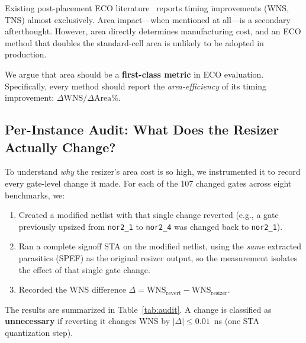 \documentclass[journal]{IEEEtran}
\begin{document}
Existing post-placement ECO literature~\cite{jiang2024ir, graphsym2023,
goalEvolve2026, elayout2026} reports timing improvements (WNS, TNS)
almost exclusively. Area impact---when mentioned at all---is a secondary
afterthought. However, area directly determines manufacturing cost, and
an ECO method that doubles the standard-cell area is unlikely to be
adopted in production.

We argue that area should be a \textbf{first-class metric} in ECO
evaluation. Specifically, every method should report the
\emph{area-efficiency} of its timing improvement:
$\Delta\text{WNS} / \Delta\text{Area}\%$.

\subsection{Per-Instance Audit: What Does the Resizer Actually Change?}
\label{sec:motivation}

To understand \emph{why} the resizer's area cost is so high, we
instrumented it to record every gate-level change it made. For each of
the 107 changed gates across eight benchmarks, we:

\begin{enumerate}
\item Created a modified netlist with that single change reverted
(e.g., a gate previously upsized from \texttt{nor2\_1} to
\texttt{nor2\_4} was changed back to \texttt{nor2\_1}).
\item Ran a complete signoff STA on the modified netlist, using the
\emph{same} extracted parasitics (SPEF) as the original resizer output,
so the measurement isolates the effect of that single gate change.
\item Recorded the WNS difference $\Delta =
\text{WNS}_{\text{revert}} - \text{WNS}_{\text{resizer}}$.
\end{enumerate}

The results are summarized in Table~\ref{tab:audit}. A change is
classified as \textbf{unnecessary} if reverting it changes WNS by
$|\Delta| \leq 0.01$~ns (one STA quantization step).
\end{document}
